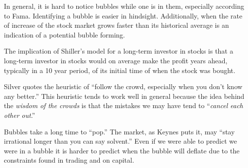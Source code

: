 \documentclass[12pt]{article}
\begin{document}
\begin{enumerate}

\begin{tcolorbox}[colback=white, sharp corners]
In general, it is hard to notice bubbles while one is in them, especially according to Fama. Identifying a bubble is easier in hindsight. Additionally, when the rate of increase of the stock market grows faster than its historical average is an indication of a potential bubble forming.
\end{tcolorbox}



\begin{tcolorbox}[colback=white, sharp corners]
The implication of Shiller's model for a long-term investor in stocks is that a long-term investor in stocks would on average make the profit years ahead, typically in a 10 year period, of its initial time of when the stock was bought. 
\end{tcolorbox}



\begin{tcolorbox}[colback=white, sharp corners]
Silver quotes the heuristic of ``follow the crowd, especially when you don't know any better.'' This heuristic tends to work well in general because the idea behind the \emph{wisdom of the crowds} is that the mistakes we may have tend to ``\emph{cancel each other out}.''
\end{tcolorbox}



\begin{tcolorbox}[colback=white, sharp corners]
Bubbles take a long time to ``pop.'' The market, as Keynes puts it, may ``stay irrational longer than you can say solvent.'' Even if we were able to predict we were in a bubble it is harder to predict when the bubble will deflate due to the constraints found in trading and on capital. 
\end{tcolorbox}



\end{enumerate}
\end{document}
